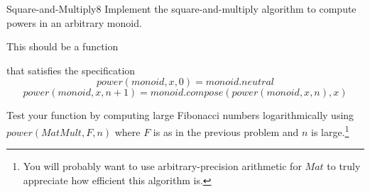 \documentclass[a4paper]{article}
\begin{document}
\begin{problem}{Square-and-Multiply}{8}
Implement the square-and-multiply algorithm to compute powers in an arbitrary monoid.

This should be a function
\begin{acode}
\end{acode}
that satisfies the specification
\[power(monoid, x, 0)=monoid.neutral\]
\[power(monoid, x, n+1)=monoid.compose(power(monoid, x, n), x)\]

Test your function by computing large Fibonacci numbers logarithmically using
$power(MatMult, F, n)$ where $F$ is as in the previous problem and $n$ is large.\footnote{You will probably want to use arbitrary-precision arithmetic for $Mat$ to truly appreciate how efficient this algorithm is.}
\end{problem}
\end{document}
